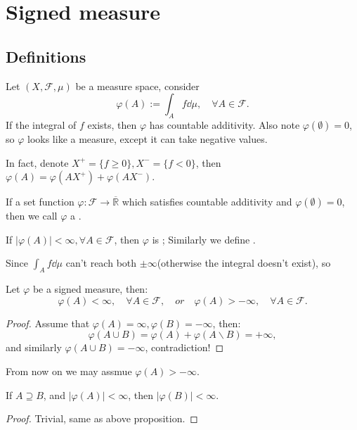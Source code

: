 \section{Signed measure}
\label{sec:Signed measure}
\subsection{Definitions}
\label{sub:Definitions}

Let $(X, \mathscr{F}, \mu)$ be a measure space, consider
\[
\varphi(A) := \int_A f\dd\mu, \quad \forall A\in \mathscr{F}.
\]
If the integral of $f$ exists, then $\varphi$ has countable additivity.
Also note $\varphi(\emptyset) = 0$, so $\varphi$ looks like a measure,
except it can take negative values.

In fact, denote  $X^+ = \{f\ge 0\}, X^- = \{f < 0\}$, then
$\varphi(A) = \varphi(AX^+) + \varphi(AX^-)$.

\begin{definition}
	If a set function $\varphi : \mathscr{F} \to \overline{\mathbb{R}}$ which
	satisfies countable additivity and $\varphi(\emptyset) = 0$,
	then we call $\varphi$ a .

	If $|\varphi(A)| < \infty, \forall A\in \mathscr{F}$, then $\varphi$ is
	; Similarly we define .
\end{definition}

Since $\int_A f\dd \mu$ can't reach both $\pm \infty$(otherwise the integral
doesn't exist), so
\begin{proposition}
	Let $\varphi$ be a signed measure, then:
	\[
	\varphi(A) < \infty, \quad \forall A\in \mathscr{F},
	\quad or \quad \varphi(A) > -\infty, \quad \forall A\in \mathscr{F}.
	\]
\end{proposition}
\begin{proof}[Proof]
    Assume that $\varphi(A) = \infty, \varphi(B) = -\infty$,
	then:
	\[
	\varphi(A\cup B) = \varphi(A) + \varphi(A\backslash B) = +\infty,
	\]
	and similarly $\varphi(A\cup B) = -\infty$, contradiction!
\end{proof}
\begin{remark}
    From now on we may assmue $\varphi(A) > -\infty$.
\end{remark}

\begin{proposition}
	If $A\supseteq B$, and $|\varphi(A)| < \infty$, then $|\varphi(B)| < \infty$.
\end{proposition}
\begin{proof}[Proof]
    Trivial, same as above proposition.
\end{proof}

